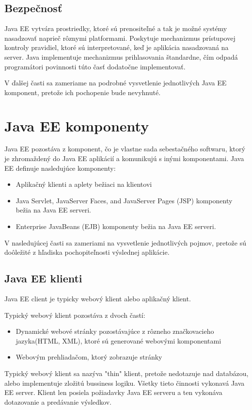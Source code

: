 \section{Bezpečnosť}

Java EE  vytvára prostriedky, ktoré sú prenositeľné a tak je možné systémy nasadzovať naprieč rôznymi platformami. Poskytuje mechanizmus  prístupovej kontroly pravidiel, ktoré sú interpretované, keď je aplikácia nasadzovaná na server. Java implementuje mechanizmus prihlasovania štandardne, čím odpadá programátori povinnosti túto časť dodatočne implementovať.

V ďalšej časti sa zameriame na podrobné vysvetlenie jednotlivých Java EE komponent, pretože ich pochopenie bude nevyhnuté.
\chapter{Java EE komponenty}
Java EE pozostáva z komponent, čo je vlastne sada sebestačného softwaru, ktorý je zhromaždený do Java EE aplikácií a komunikujú s inými komponentami. Java EE definuje nasledujúce komponenty: 
\begin{itemize}
\item Aplikačný klienti a aplety bežiaci na klientovi
\item Java Servlet, JavaServer Faces, and JavaServer Pages (JSP) komponenty bežia na Java EE serveri\cite{fitWeb}.
\item Enterprise JavaBeans (EJB) komponenty bežia na Java EE serveri\cite{fitWeb}.
\end{itemize}

V nasledujúcej časti sa zameriami na vysvetlenie jednotlivých pojmov, pretože sú doôležité z hľadiska pochopiteľnosti výslednej aplikácie.

\section{Java EE klienti}
Java EE client je typicky webový klient alebo aplikačný klient.

Typický webový klient pozostáva z dvoch častí:
\begin{itemize}
\item Dynamické webové stránky pozostávajúce z rôzneho značkovacieho jazyka(HTML, XML), ktoré sú generované webovými komponentami
\item Webovým prehliadačom, ktorý zobrazuje stránky
\end{itemize}
Typický webový klient sa nazýva "thin" klient, pretože nedotazuje nad databázou, alebo implementuje zložitú bussiness logiku. Všetky tieto činnosti vykonavá Java EE server. Klient len posiela požiadavky Java EE serveru a ten vykonáva dotazovanie a predávanie výsledkov.



